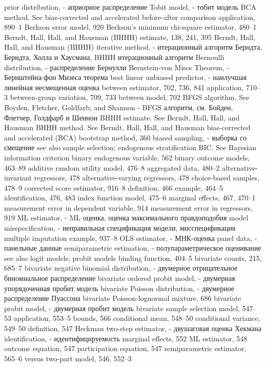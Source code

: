 prior distribution, - априорное распределение
Tobit model, - тобит модель
BCA method. See bias-corrected and accelerated before-after comparison
application, 890–1
Berkson error model, 920
Berkson’s minimum chi-square estimator, 480–1 Berndt, Hall, Hall, and Hausman (BHHH) estimate,
138, 241, 395
Berndt, Hall, Hall, and Hausman (BHHH) iterative method, - итерационный алгоритм Берндта, Берндта, Холла и Хаусмана, BHHH итерационный алгоритм
Bernoulli distribution, - распределение Бернулли 
Bernstein-von Mises Theorem, - Бернштейна-фон Мизеса теорема
best linear unbiased predictor, - наилучшая линейная несмещенная оценка
between estimator, 702, 736, 841
application, 710–3
between-group variation, 709, 733
between model, 702
BFGS algorithm. See Boyden, Fletcher, Goldfarb, and Shannon - BFGS алгоритм, см. Бойден, Флетчер, Голдфарб и Шеннон 
BHHH estimate. See Berndt, Hall, Hall, and Hausman BHHH method. See Berndt, Hall, Hall, and Hausman bias-corrected and accelerated (BCA) bootstrap
method, 360
biased sampling, - выборка со смещение
see also sample selection; endogenous stratification BIC. See Bayesian information criterion
binary endogenous variable, 562
binary outcome models, 463–89
additive random utility model, 476–8 aggregated data, 480–2 alternative-invariant regressors, 478
alternative-varying regressors, 478 choice-based samples, 478–9 corrected score estimator, 916–8 definition, 466
example, 464–5
identification, 476, 483
index function model, 475–6
marginal effects, 467, 470–1
measurement error in dependent variable, 914 measurement error in regressors, 919
ML estimator, - ML оценка, оценка максимального правдоподобия
model misspecification, - неправильная спецификация модели, мисспецификация
multiple imputation example, 937–8
OLS estimator, - МНК-оценка
panel data, - панельные данные
semiparametric estimation, - полупараметрическое оценивание
see also logit models; probit models
binding function, 404–5
bivariate counts, 215, 685–7
bivariate negative binomial distribution, - двумерное отрицательное биномиальное распределение 
bivariate ordered probit model, - двумерная упорядоченная пробит модель
bivariate Poisson distribution, - двумерное распределение Пуассона
bivariate Poisson-lognormal mixture, 686 
bivariate probit model, - двумерная пробит модель
bivariate sample selection model, 547–53
application, 553–5
bounds, 566
conditional mean, 548–50 conditional variance, 549–50 definition, 547
Heckman two-step estimator, - двушаговая оценка Хекмана 
identification, - идентифицируемость
marginal effects, 552
ML estimator, 548
outcome equation, 547 participation equation, 547 semiparametric estimator, 565–6 versus two-part model, 546, 552–3
